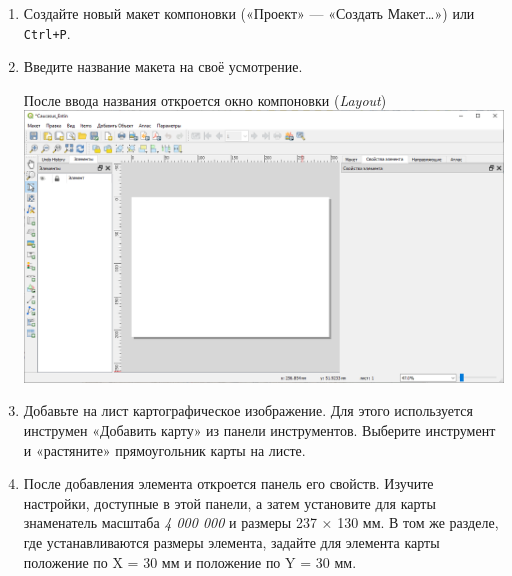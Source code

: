 \documentclass[
  12pt,
]{book}
\begin{document}
\begin{enumerate}
\def\labelenumi{\arabic{enumi}.}
\item
  Создайте новый макет компоновки («Проект» --- «Создать Макет\ldots») или \texttt{Ctrl+P}.
\item
  Введите название макета на своё усмотрение.

  После ввода названия откроется окно компоновки (\emph{Layout})\\
  \includegraphics{images/Ex01/Layout.png}
\item
  Добавьте на лист картографическое изображение. Для этого используется инструмен «Добавить карту» из панели инструментов. Выберите инструмент и «растяните» прямоугольник карты на листе.
\item
  После добавления элемента откроется панель его свойств. Изучите настройки, доступные в этой панели, а затем установите для карты знаменатель масштаба \emph{4 000 000} и размеры 237 × 130 мм. В том же разделе, где устанавливаются размеры элемента, задайте для элемента карты положение по X = 30 мм и положение по Y = 30 мм.


\end{enumerate}
\end{document}
